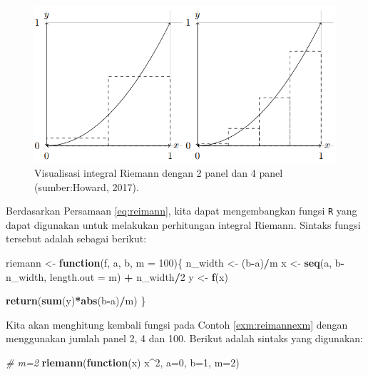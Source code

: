 \documentclass[]{book}
\newenvironment{Shaded}{\begin{snugshade}}{\end{snugshade}}
\newcommand{\CommentTok}[1]{\textcolor[rgb]{0.56,0.35,0.01}{\textit{#1}}}
\newcommand{\ControlFlowTok}[1]{\textcolor[rgb]{0.13,0.29,0.53}{\textbf{#1}}}
\newcommand{\DataTypeTok}[1]{\textcolor[rgb]{0.13,0.29,0.53}{#1}}
\newcommand{\DecValTok}[1]{\textcolor[rgb]{0.00,0.00,0.81}{#1}}
\newcommand{\KeywordTok}[1]{\textcolor[rgb]{0.13,0.29,0.53}{\textbf{#1}}}
\newcommand{\NormalTok}[1]{#1}
\newcommand{\OperatorTok}[1]{\textcolor[rgb]{0.81,0.36,0.00}{\textbf{#1}}}
\newcommand{\StringTok}[1]{\textcolor[rgb]{0.31,0.60,0.02}{#1}}
\theoremstyle{definition}
\theoremstyle{definition}
\theoremstyle{definition}
\theoremstyle{remark}
\begin{document}
\begin{figure}

{\centering \includegraphics[width=0.9\linewidth]{./images/midpt} 

}

\caption{Visualisasi integral Riemann dengan 2 panel dan 4 panel (sumber:Howard, 2017).}\label{fig:midpt}
\end{figure}

Berdasarkan Persamaan \eqref{eq:reimann}, kita dapat mengembangkan fungsi \texttt{R} yang dapat digunakan untuk melakukan perhitungan integral Riemann. Sintaks fungsi tersebut adalah sebagai berikut:

\begin{Shaded}
\begin{Highlighting}[]
\NormalTok{riemann <-}\StringTok{ }\ControlFlowTok{function}\NormalTok{(f, a, b, }\DataTypeTok{m =} \DecValTok{100}\NormalTok{)\{}
\NormalTok{  n_width <-}\StringTok{ }\NormalTok{(b}\OperatorTok{-}\NormalTok{a)}\OperatorTok{/}\NormalTok{m}
\NormalTok{  x <-}\StringTok{ }\KeywordTok{seq}\NormalTok{(a, b}\OperatorTok{-}\NormalTok{n_width, }\DataTypeTok{length.out =}\NormalTok{ m) }\OperatorTok{+}\StringTok{ }\NormalTok{n_width}\OperatorTok{/}\DecValTok{2}
\NormalTok{  y <-}\StringTok{ }\KeywordTok{f}\NormalTok{(x)}
  
  \KeywordTok{return}\NormalTok{(}\KeywordTok{sum}\NormalTok{(y)}\OperatorTok{*}\KeywordTok{abs}\NormalTok{(b}\OperatorTok{-}\NormalTok{a)}\OperatorTok{/}\NormalTok{m)}
\NormalTok{\}}
\end{Highlighting}
\end{Shaded}

Kita akan menghitung kembali fungsi pada Contoh \ref{exm:reimannexm} dengan menggunakan jumlah panel 2, 4 dan 100. Berikut adalah sintaks yang digunakan:

\begin{Shaded}
\begin{Highlighting}[]
\CommentTok{# m=2}
\KeywordTok{riemann}\NormalTok{(}\ControlFlowTok{function}\NormalTok{(x) x}\OperatorTok{^}\DecValTok{2}\NormalTok{, }\DataTypeTok{a=}\DecValTok{0}\NormalTok{, }\DataTypeTok{b=}\DecValTok{1}\NormalTok{, }\DataTypeTok{m=}\DecValTok{2}\NormalTok{)}
\end{Highlighting}
\end{Shaded}
\end{document}
